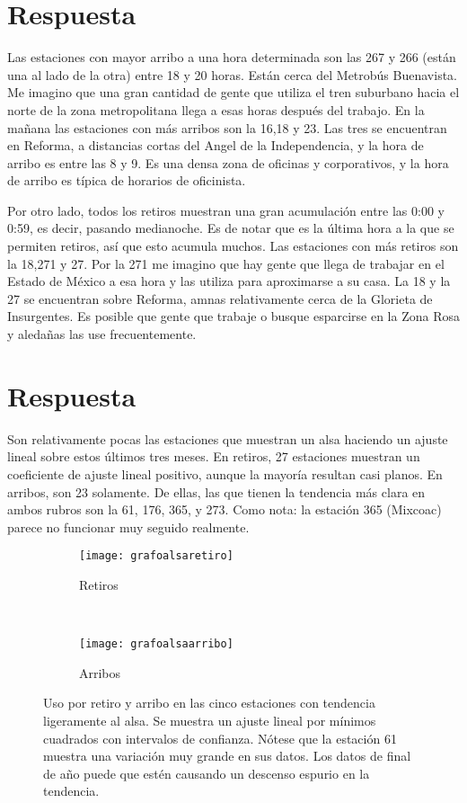 \documentclass{article}
\begin{document}
\section{Respuesta}

Las estaciones con mayor arribo a una hora determinada son las 267 y 266 (están una al lado de la otra) entre 18 y 20 horas. Están cerca del Metrobús Buenavista. Me imagino que una gran cantidad de gente que utiliza el tren suburbano hacia el norte de la zona metropolitana llega a esas horas después del trabajo. En la mañana las estaciones con más arribos son la 16,18 y 23. Las tres se encuentran en Reforma, a distancias cortas del Angel de la Independencia, y la hora de arribo es entre las 8 y 9. Es una densa zona de oficinas y corporativos, y la hora de arribo es típica de horarios de oficinista.

Por otro lado, todos los retiros muestran una gran acumulación entre las 0:00 y 0:59, es decir, pasando medianoche. Es de notar que es la última hora a la que se permiten retiros, así que esto acumula muchos. Las estaciones con más retiros son la 18,271 y 27. Por la 271 me imagino que hay gente que llega de trabajar en el Estado de México a esa hora y las utiliza para aproximarse a su casa. La 18 y la 27 se encuentran sobre Reforma, amnas relativamente cerca de la Glorieta de Insurgentes. Es posible que gente que trabaje o busque esparcirse en la Zona Rosa y aledañas las use frecuentemente.

\section{Respuesta}

Son relativamente pocas las estaciones que muestran un alsa haciendo un ajuste lineal sobre estos últimos tres meses. En retiros, 27 estaciones muestran un coeficiente de ajuste lineal positivo, aunque la mayoría resultan casi planos. En arribos, son 23 solamente.
De ellas, las que tienen la tendencia más clara en ambos rubros son la 61, 176, 365, y 273. Como nota: la estación 365 (Mixcoac) parece no funcionar muy seguido realmente.

\begin{figure}
  \centering
    \begin{subfigure}[b]{0.45\textwidth}
        \texttt{[image: grafoalsaretiro]}
        \caption{Retiros}
        \label{figret}
    \end{subfigure}
    ~       
    \begin{subfigure}[b]{0.45\textwidth}
        \texttt{[image: grafoalsaarribo]}
        \caption{Arribos}
        \label{figarr}
    \end{subfigure}
    \caption{Uso por retiro y arribo en las cinco estaciones con tendencia ligeramente al alsa. Se muestra un ajuste lineal por mínimos cuadrados con intervalos de confianza. Nótese que la estación 61 muestra una variación muy grande en sus datos. Los datos de final de año puede que estén causando un descenso espurio en la tendencia.}
\end{figure}
\end{document}
